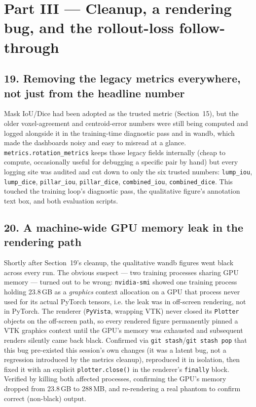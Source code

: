 \documentclass[11pt]{article}
\newcommand{\hsec}[1]{\section*{\color{hdrblue}#1}}
\newcommand{\hsub}[1]{\subsection*{#1}}
\begin{document}
\hsec{Part III --- Cleanup, a rendering bug, and the rollout-loss follow-through}

\hsub{19. Removing the legacy metrics everywhere, not just from the headline number}
Mask IoU/Dice had been adopted as the trusted metric (Section~15), but the older
voxel-agreement and centroid-error numbers were still being computed and logged alongside it
in the training-time diagnostic pass and in wandb, which made the dashboards noisy and easy to
misread at a glance. \texttt{metrics.rotation\_metrics} keeps those legacy fields internally
(cheap to compute, occasionally useful for debugging a specific pair by hand) but every logging
site was audited and cut down to only the six trusted numbers: \texttt{lump\_iou},
\texttt{lump\_dice}, \texttt{pillar\_iou}, \texttt{pillar\_dice}, \texttt{combined\_iou},
\texttt{combined\_dice}. This touched the training loop's diagnostic pass, the qualitative
figure's annotation text box, and both evaluation scripts.

\hsub{20. A machine-wide GPU memory leak in the rendering path}
Shortly after Section~19's cleanup, the qualitative wandb figures went black across every
run. The obvious suspect --- two training processes sharing GPU memory --- turned out to be
wrong: \texttt{nvidia-smi} showed one training process holding 23.8\,GB as a \emph{graphics}
context allocation on a GPU that process never used for its actual PyTorch tensors, i.e. the
leak was in off-screen rendering, not in PyTorch. The renderer (\texttt{PyVista}, wrapping
VTK) never closed its \texttt{Plotter} objects on the off-screen path, so every rendered
figure permanently pinned a VTK graphics context until the GPU's memory was exhausted and
subsequent renders silently came back black. Confirmed via \texttt{git stash}/\texttt{git
stash pop} that this bug pre-existed this session's own changes (it was a latent bug, not a
regression introduced by the metrics cleanup), reproduced it in isolation, then fixed it with
an explicit \texttt{plotter.close()} in the renderer's \texttt{finally} block. Verified by
killing both affected processes, confirming the GPU's memory dropped from 23.8\,GB to
288\,MB, and re-rendering a real phantom to confirm correct (non-black) output.
\end{document}
